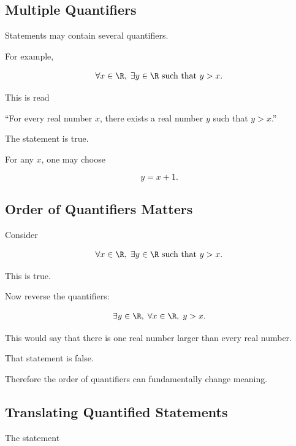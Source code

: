 \subsection{Multiple Quantifiers}
\label{subsec:multiple-quantifiers}

Statements may contain several quantifiers.

For example,

\[ \forall x\in\R,\;\exists y\in\R\text{ such that }y>x. \]

This is read

\begin{center}
``For every real number \(x\), there exists a real number \(y\) such that
\(y>x\).''
\end{center}

The statement is true.

For any \(x\), one may choose

\[ y=x+1. \]

\subsection{Order of Quantifiers Matters}
\label{subsec:quantifier-order}

Consider

\[ \forall x\in\R,\;\exists y\in\R\text{ such that }y>x. \]

This is true.

Now reverse the quantifiers:

\[ \exists y\in\R,\;\forall x\in\R,\;y>x. \]

This would say that there is one real number larger than every real number.

That statement is false.

Therefore the order of quantifiers can fundamentally change meaning.

\subsection{Translating Quantified Statements}
\label{subsec:translating-quantified-statements}

The statement

